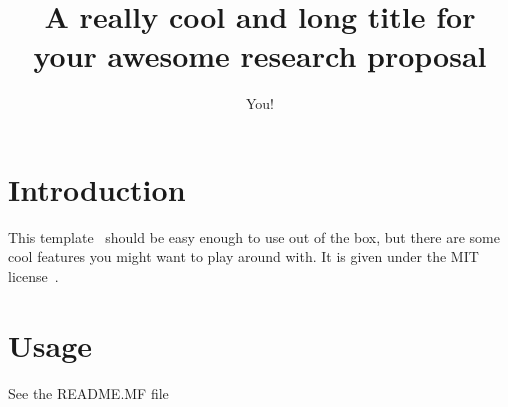 \documentclass[widemargins, newpage]{phd_proposal}
\title{A really cool and long title for your awesome research proposal}
\author{You!}
\begin{document}
\maketitle

\begin{abstract}
\lipsum[1]
\end{abstract}

% 

\section{Introduction}
This template~\cite{github-repo} should be easy enough to use out of the box, but there are some cool features you might want to play around with.
It is given under the MIT license~\cite{mit-license}.

\section{Usage}

See the README.MF file





\begin{small}

\end{small}
\end{document}
